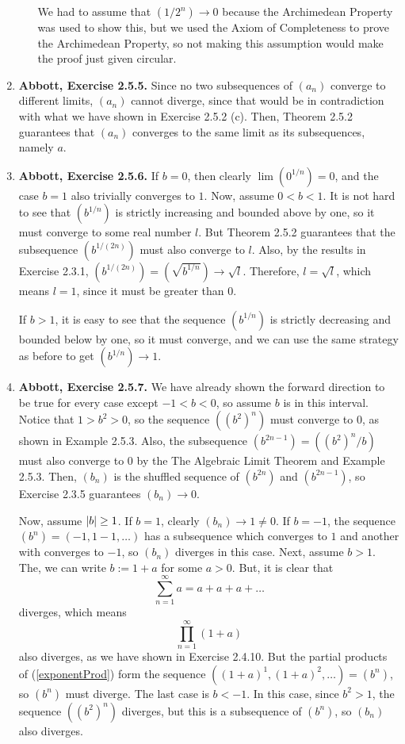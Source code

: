 \documentclass{article}
\DeclarePairedDelimiter\abs{\lvert}{\rvert}
\newcommand{\ra}{\rightarrow}
\newcommand{\exc}[2][Abbott]{\item \textbf{#1, Exercise #2.}}
\begin{document}
\begin{enumerate}
\begin{enumerate}
        We had to assume that $(1/2^n) \ra 0$ because the Archimedean Property was used to show this, but we used the Axiom of Completeness to prove the Archimedean Property, so not making this assumption would make the proof just given circular.
    \end{enumerate}
    
    \exc{2.5.5}
    Since no two subsequences of $(a_n)$ converge to different limits, $(a_n)$ cannot diverge, since that would be in contradiction with what we have shown in Exercise 2.5.2 (c). Then, Theorem 2.5.2 guarantees that $(a_n)$ converges to the same limit as its subsequences, namely $a$.
    
    \exc{2.5.6}
    If $b = 0$, then clearly $\lim(0^{1/n}) = 0$, and the case $b=1$ also trivially converges to $1$. Now, assume $0 < b < 1$. It is not hard to see that $(b^{1/n})$ is strictly increasing and bounded above by one, so it must converge to some real number $l$. But Theorem 2.5.2 guarantees that the subsequence $(b^{1/(2n)})$ must also converge to $l$. Also, by the results in Exercise 2.3.1, $(b^{1/(2n)}) = (\sqrt{b^{1/n}}) \ra \sqrt{l}$. Therefore, $l = \sqrt{l}$, which means $l = 1$, since it must be greater than 0.
    
    If $b > 1$, it is easy to see that the sequence $(b^{1/n})$ is strictly decreasing and bounded below by one, so it must converge, and we can use the same strategy as before to get $(b^{1/n}) \ra 1$.
    
    \exc{2.5.7}
     We have already shown the forward direction to be true for every case except $-1 < b < 0$, so assume $b$ is in this interval. Notice that $1 > b^2 > 0$, so the sequence $((b^2)^n)$ must converge to $0$, as shown in Example 2.5.3. Also, the subsequence $(b^{2n-1}) = ((b^2)^n/b)$ must also converge to $0$ by the The Algebraic Limit Theorem and Example 2.5.3. Then, $(b_n)$ is the shuffled sequence of $(b^{2n})$ and $(b^{2n-1})$, so Exercise 2.3.5 guarantees $(b_n) \ra 0$.
    
    Now, assume $\abs*{b} \geq 1$. If $b = 1$, clearly $(b_n) \ra 1 \neq 0$. If $b = -1$, the sequence $(b^n) = (-1,1-1,\dots)$ has a subsequence which converges to $1$ and another with converges to $-1$, so $(b_n)$ diverges in this case. Next, assume $b > 1$. The, we can write $b := 1 + a$ for some $a > 0$. But, it is clear that 
    \begin{equation*}
        \sum_{n=1}^\infty a = a + a + a + \dots
    \end{equation*} diverges, which means
    \begin{equation} \label{exponentProd}
        \prod_{n=1}^\infty (1+a)
    \end{equation} also diverges, as we have shown in Exercise 2.4.10. But the partial products of (\ref{exponentProd}) form the sequence $((1+a)^1, (1+a)^2, \dots) = (b^n)$, so $(b^n)$ must diverge. The last case is $b < -1$. In this case, since $b^2 > 1$, the sequence $((b^2)^n)$ diverges, but this is a subsequence of $(b^n)$, so $(b_n)$ also diverges.
    

\end{enumerate}
\end{document}
